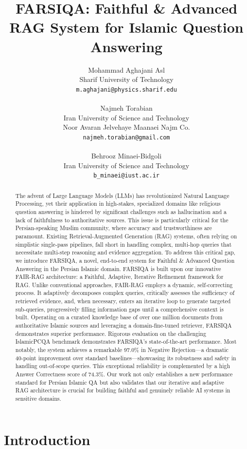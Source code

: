 \documentclass[11pt]{article}
\title{FARSIQA: Faithful \& Advanced RAG System for Islamic Question Answering}
\author{Mohammad Aghajani Asl \\
  Sharif University of Technology \\
  \texttt{m.aghajani@physics.sharif.edu} \\ \\
  Najmeh Torabian \\
  Iran University of Science and Technology \\
  Noor Avaran Jelvehaye Maanaei Najm Co. \\
  \texttt{najmeh.torabian@gmail.com} \\ \\
  Behrooz Minaei-Bidgoli \\
  Iran University of Science and Technology \\
  \texttt{b\_minaei@iust.ac.ir}}
\begin{document}
\maketitle
\begin{abstract}
The advent of Large Language Models (LLMs) has revolutionized Natural Language Processing, yet their application in high-stakes, specialized domains like religious question answering is hindered by significant challenges such as hallucination and a lack of faithfulness to authoritative sources. This issue is particularly critical for the Persian-speaking Muslim community, where accuracy and trustworthiness are paramount. Existing Retrieval-Augmented Generation (RAG) systems, often relying on simplistic single-pass pipelines, fall short in handling complex, multi-hop queries that necessitate multi-step reasoning and evidence aggregation. To address this critical gap, we introduce FARSIQA, a novel, end-to-end system for Faithful \& Advanced Question Answering in the Persian Islamic domain. FARSIQA is built upon our innovative FAIR-RAG architecture: a Faithful, Adaptive, Iterative Refinement framework for RAG. Unlike conventional approaches, FAIR-RAG employs a dynamic, self-correcting process. It adaptively decomposes complex queries, critically assesses the sufficiency of retrieved evidence, and, when necessary, enters an iterative loop to generate targeted sub-queries, progressively filling information gaps until a comprehensive context is built. Operating on a curated knowledge base of over one million documents from authoritative Islamic sources and leveraging a domain-fine-tuned retriever, FARSIQA demonstrates superior performance. Rigorous evaluation on the challenging IslamicPCQA benchmark demonstrates FARSIQA's state-of-the-art performance. Most notably, the system achieves a remarkable 97.0\% in Negative Rejection---a dramatic 40-point improvement over standard baselines---showcasing its robustness and safety in handling out-of-scope queries. This exceptional reliability is complemented by a high Answer Correctness score of 74.3\%. Our work not only establishes a new performance standard for Persian Islamic QA but also validates that our iterative and adaptive RAG architecture is crucial for building faithful and genuinely reliable AI systems in sensitive domains.
\end{abstract}

\section{Introduction}
\end{document}
